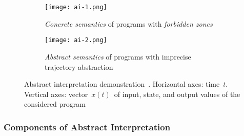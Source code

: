\begin{figure}[hbt]
    \centering

    \begin{subfigure}[hbt]{.45 \linewidth}
        \centering
        \texttt{[image: ai-1.png]}
        \caption{%
            \emph{Concrete semantics} of programs with
            \emph{forbidden zones}
        }
        \label{fig:ai1}
    \end{subfigure}
%
    \hfill
%
    \begin{subfigure}[hbt]{.45\linewidth}
        \centering
        \texttt{[image: ai-2.png]}
        \caption{%
            \emph{Abstract semantics} of programs with imprecise
            trajectory abstraction
        }
        \label{fig:ai2}
    \end{subfigure}

    \caption{%
        Abstract interpretation demonstration~\cite{AIInNutshellCousot}.
        Horizontal axes: time~$ t $. Vertical axes:
        vector~$ x(t) $~of input, state, and output values of the
        considered program
    }
\end{figure}

\subsubsection{Components of Abstract Interpretation}

